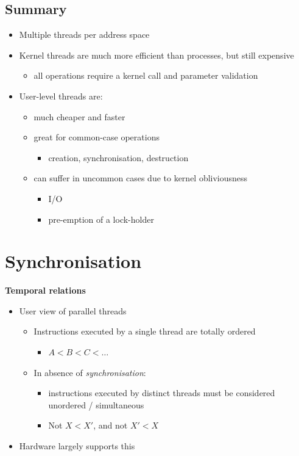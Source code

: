 \documentclass[11pt,a4paper]{article}
\begin{document}
\subsection{Summary}
\begin{itemize}
    \item Multiple threads per address space
    \item Kernel threads are much more efficient than processes, but still expensive
        \begin{itemize}
            \item all operations require a kernel call and parameter validation
        \end{itemize}
    \item User-level threads are:
        \begin{itemize}
            \item much cheaper and faster
            \item great for common-case operations
                \begin{itemize}
                    \item creation, synchronisation, destruction
                \end{itemize}
            \item can suffer in uncommon cases due to kernel obliviousness
                \begin{itemize}
                    \item I/O
                    \item pre-emption of a lock-holder
                \end{itemize}
        \end{itemize}
\end{itemize}

\section{Synchronisation}

\textbf{Temporal relations}
\begin{itemize}
    \item User view of parallel threads
        \begin{itemize}
            \item Instructions executed by a single thread are totally ordered
                \begin{itemize}
                    \item $A < B < C < \dots$
                \end{itemize}
            \item In absence of \emph{synchronisation}:
                \begin{itemize}
                    \item instructions executed by distinct threads must be considered
                        unordered / simultaneous
                    \item Not $X < X'$, and not $X' < X$
                \end{itemize}
        \end{itemize}
    \item Hardware largely supports this
\end{itemize}
\end{document}
